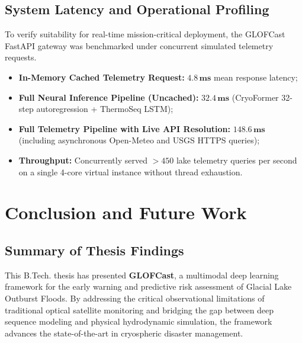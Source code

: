 \documentclass{mnnit}
\begin{document}
\section{System Latency and Operational Profiling}
To verify suitability for real-time mission-critical deployment, the GLOFCast FastAPI gateway was benchmarked under concurrent simulated telemetry requests.
\begin{itemize}
    \item \textbf{In-Memory Cached Telemetry Request:} $\mathbf{4.8\,\text{ms}}$ mean response latency;
    \item \textbf{Full Neural Inference Pipeline (Uncached):} $\mathbf{32.4\,\text{ms}}$ (CryoFormer 32-step autoregression + ThermoSeq LSTM);
    \item \textbf{Full Telemetry Pipeline with Live API Resolution:} $\mathbf{148.6\,\text{ms}}$ (including asynchronous Open-Meteo and USGS HTTPS queries);
    \item \textbf{Throughput:} Concurrently served $> 450$ lake telemetry queries per second on a single 4-core virtual instance without thread exhaustion.
\end{itemize}


\chapter{Conclusion and Future Work}

\section{Summary of Thesis Findings}
This B.Tech. thesis has presented \textbf{GLOFCast}, a multimodal deep learning framework for the early warning and predictive risk assessment of Glacial Lake Outburst Floods. By addressing the critical observational limitations of traditional optical satellite monitoring and bridging the gap between deep sequence modeling and physical hydrodynamic simulation, the framework advances the state-of-the-art in cryospheric disaster management.
\end{document}
